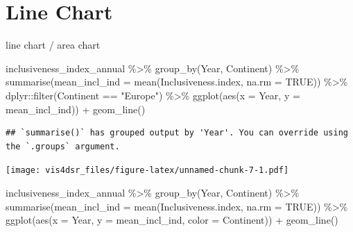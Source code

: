 \documentclass[
]{krantz}
\makeatletter
\newenvironment{Shaded}{\begin{snugshade}}{\end{snugshade}}
\newcommand{\AttributeTok}[1]{\textcolor[rgb]{0.61,0.61,0.61}{#1}}
\newcommand{\ConstantTok}[1]{\textcolor[rgb]{0,0,0}{#1}}
\newcommand{\FunctionTok}[1]{\textcolor[rgb]{0,0,0}{#1}}
\newcommand{\NormalTok}[1]{#1}
\newcommand{\SpecialCharTok}[1]{\textcolor[rgb]{0,0,0}{#1}}
\newcommand{\StringTok}[1]{\textcolor[rgb]{0.5,0.5,0.5}{#1}}
\newenvironment{kframe}{%
\medskip{}
\setlength{\fboxsep}{.8em}
 \def\at@end@of@kframe{}%
 \ifinner\ifhmode%
  \def\at@end@of@kframe{\end{minipage}}%
  \begin{minipage}{\columnwidth}%
 \fi\fi%
 \def\FrameCommand##1{\hskip\@totalleftmargin \hskip-\fboxsep
 \colorbox{shadecolor}{##1}\hskip-\fboxsep
     \hskip-\linewidth \hskip-\@totalleftmargin \hskip\columnwidth}%
 \MakeFramed {\advance\hsize-\width
   \@totalleftmargin\z@ \linewidth\hsize
   \@setminipage}}%
 {\par\unskip\endMakeFramed%
 \at@end@of@kframe}
\renewenvironment{Shaded}{\begin{kframe}}{\end{kframe}}
\makeatother
\begin{document}
\hypertarget{line-chart}{%
\section{Line Chart}\label{line-chart}}

line chart / area chart

\begin{Shaded}
\begin{Highlighting}[]
\NormalTok{inclusiveness\_index\_annual }\SpecialCharTok{\%\textgreater{}\%}
  \FunctionTok{group\_by}\NormalTok{(Year, Continent) }\SpecialCharTok{\%\textgreater{}\%}
  \FunctionTok{summarise}\NormalTok{(}\AttributeTok{mean\_incl\_ind =} \FunctionTok{mean}\NormalTok{(Inclusiveness.index, }\AttributeTok{na.rm =} \ConstantTok{TRUE}\NormalTok{)) }\SpecialCharTok{\%\textgreater{}\%}
\NormalTok{  dplyr}\SpecialCharTok{::}\FunctionTok{filter}\NormalTok{(Continent }\SpecialCharTok{==} \StringTok{"Europe"}\NormalTok{) }\SpecialCharTok{\%\textgreater{}\%}
\FunctionTok{ggplot}\NormalTok{(}\FunctionTok{aes}\NormalTok{(}\AttributeTok{x =}\NormalTok{ Year, }
           \AttributeTok{y =}\NormalTok{ mean\_incl\_ind)) }\SpecialCharTok{+}
  \FunctionTok{geom\_line}\NormalTok{()}
\end{Highlighting}
\end{Shaded}

\begin{verbatim}
## `summarise()` has grouped output by 'Year'. You can override using the `.groups` argument.
\end{verbatim}

\texttt{[image: vis4dsr\_files/figure-latex/unnamed-chunk-7-1.pdf]}

\begin{Shaded}
\begin{Highlighting}[]
\NormalTok{inclusiveness\_index\_annual }\SpecialCharTok{\%\textgreater{}\%}
  \FunctionTok{group\_by}\NormalTok{(Year, Continent) }\SpecialCharTok{\%\textgreater{}\%}
  \FunctionTok{summarise}\NormalTok{(}\AttributeTok{mean\_incl\_ind =} \FunctionTok{mean}\NormalTok{(Inclusiveness.index, }\AttributeTok{na.rm =} \ConstantTok{TRUE}\NormalTok{)) }\SpecialCharTok{\%\textgreater{}\%}
  \FunctionTok{ggplot}\NormalTok{(}\FunctionTok{aes}\NormalTok{(}\AttributeTok{x =}\NormalTok{ Year, }
             \AttributeTok{y =}\NormalTok{ mean\_incl\_ind,}
             \AttributeTok{color =}\NormalTok{ Continent)) }\SpecialCharTok{+}
    \FunctionTok{geom\_line}\NormalTok{()}
\end{Highlighting}
\end{Shaded}
\end{document}
